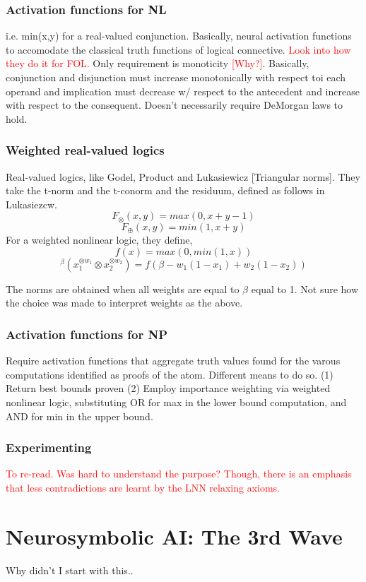 \documentclass[a4paper,11pt]{article}
\begin{document}
\subsubsection{Activation functions for NL}
i.e. min(x,y) for a real-valued conjunction. Basically, neural activation functions to accomodate the classical truth functions of logical connective. \textcolor{red}{Look into how they do it for FOL.} Only requirement is monoticity \textcolor{red}{[Why?]}. 
Basically, conjunction and disjunction must increase monotonically with respect toi each operand and implication must decrease w/ respect to the antecedent and increase with respect to the consequent. 
Doesn't necessarily require DeMorgan laws to hold.

\subsubsection{Weighted real-valued logics}
Real-valued logics, like Godel, Product and Lukasiewicz [Triangular norms]. They take the t-norm and the t-conorm and the residuum, defined as follows in Lukasiezcw. 
\[
F_\otimes(x,y) = max(0, x+y-1)
\]
\[
F_\oplus(x,y) = min(1, x+y)
\]
For a weighted nonlinear logic, they define,
\[
f(x) = max(0, min(1, x))
\]
\[
^\beta(x_1^{\otimes w_1} \otimes x_2^{\otimes w_2}) = f(\beta - w_1(1-x_1) + w_2(1-x_2))    
\]

The norms are obtained when all weights are equal to $\beta$ equal to 1. Not sure how the choice was made to interpret weights as the above. 

\subsubsection{Activation functions for NP}
Require activation functions that aggregate truth values found for the varous computations identified as proofs of the atom. 
Different means to do so. (1) Return best bounds proven (2) Employ importance weighting via weighted nonlinear logic, substituting OR for max in the lower bound computation, 
and AND for min in the upper bound.  

\subsubsection{Experimenting}
\textcolor{red}{To re-read. Was hard to understand the purpose? Though, there is an emphasis that less contradictions are learnt by the LNN relaxing axioms.}

\section{Neurosymbolic AI: The 3rd Wave \cite{garcez2020neurosymbolic}}
Why didn't I start with this..




\end{document}
